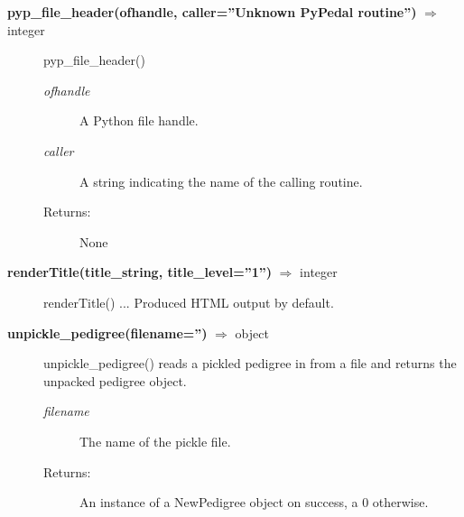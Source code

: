 \begin{description}
\item[\textbf{pyp\_file\_header(ofhandle, caller=''Unknown PyPedal routine'')} $\Rightarrow$ integer]
pyp\_file\_header()
\begin{description}
\item[\emph{ofhandle}] A Python file handle.
\item[\emph{caller}] A string indicating the name of the calling routine.
\item[Returns:] None
\end{description}

\item[\textbf{renderTitle(title\_string, title\_level=''1'')} $\Rightarrow$ integer]
renderTitle() ... Produced HTML output by default.

\item[\textbf{unpickle\_pedigree(filename='')} $\Rightarrow$ object]
unpickle\_pedigree() reads a pickled pedigree in from a file and returns the unpacked pedigree object.
\begin{description}
\item[\emph{filename}] The name of the pickle file.
\item[Returns:] An instance of a NewPedigree object on success, a 0 otherwise.
\end{description}

\end{description}
